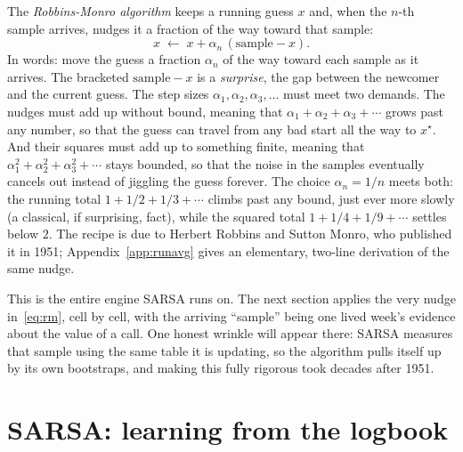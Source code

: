 \documentclass[11pt,a4paper]{article}
\theoremstyle{definition}
\theoremstyle{remark}
\numberwithin{equation}{section}
\begin{document}
The \emph{Robbins-Monro algorithm} keeps a running guess $x$ and, when the $n$-th sample
arrives, nudges it a fraction of the way toward that sample:
\begin{equation}\label{eq:rm}
x \;\leftarrow\; x + \alpha_n\,(\text{sample} - x).
\end{equation}
In words: move the guess a fraction $\alpha_n$ of the way toward each sample as it arrives. The
bracketed $\text{sample} - x$ is a \emph{surprise}, the gap between the newcomer and the
current guess. The step sizes $\alpha_1, \alpha_2, \alpha_3, \dots$ must meet two demands. The
nudges must add up without bound, meaning that $\alpha_1 + \alpha_2 + \alpha_3 + \cdots$ grows
past any number, so that the guess can travel from any bad start all the way to $x^\star$. And
their squares must add up to something finite, meaning that
$\alpha_1^2 + \alpha_2^2 + \alpha_3^2 + \cdots$ stays bounded, so that the noise in the samples
eventually cancels out instead of jiggling the guess forever. The choice $\alpha_n = 1/n$ meets
both: the running total $1 + 1/2 + 1/3 + \cdots$ climbs past any bound, just ever more slowly
(a classical, if surprising, fact), while the squared total $1 + 1/4 + 1/9 + \cdots$ settles
below $2$. The recipe is due to Herbert Robbins and Sutton Monro, who published it in 1951;
Appendix~\ref{app:runavg} gives an elementary, two-line derivation of the same nudge.

This is the entire engine SARSA runs on. The next section applies the very nudge
in~\eqref{eq:rm}, cell by cell, with the arriving ``sample'' being one lived week's evidence
about the value of a call. One honest wrinkle will appear there: SARSA measures that sample
using the same table it is updating, so the algorithm pulls itself up by its own bootstraps,
and making this fully rigorous took decades after 1951.

\section{SARSA: learning from the logbook}\label{sec:sarsa}
\end{document}
